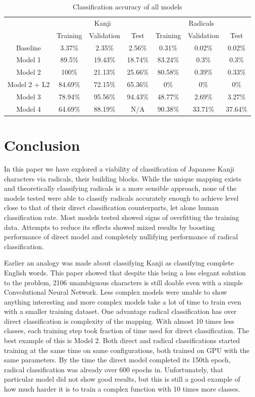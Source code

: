 \documentclass{article}
\begin{document}
\begin{CJK*}{UTF8}{min}
\begin{table}[h]
    \centering
    \begin{tabular}{|c|c|c|c|c|c|c|}
        \hline
         & \multicolumn{3}{c|}{Kanji} & \multicolumn{3}{c|}{Radicals}\\
        \cline{2-7}
         & Training & Validation & Test & Training & Validation & Test \\
        \hline
        Baseline & 3.37\% & 2.35\% & 2.56\% & 0.31\% & 0.02\% & 0.02\% \\
        Model 1 & 89.5\% & 19.43\% & 18.74\% & 83.24\% & 0.3\% & 0.3\% \\
        Model 2 & 100\% & 21.13\% & 25.66\% & 80.58\% & 0.39\% & 0.33\% \\
        Model 2 + L2 & 84.69\% & 72.15\% & 65.36\% & 0\% & 0\% & 0\% \\
        Model 3 & 78.94\% & 95.56\% & 94.43\% & 48.77\% & 2.69\% & 3.27\% \\
        Model 4 & 64.69\% & 88.19\% & N/A & 90.38\% & 33.71\% & 37.64\% \\
        \hline
    \end{tabular}
    \caption{Classification accuracy of all models}
    \label{tab:performance}
\end{table}

\section{Conclusion}
In this paper we have explored a viability of classification of Japanese Kanji characters via radicals, their building blocks. While the unique mapping exists and theoretically classifying radicals is a more sensible approach, none of the models tested were able to classify radicals accurately enough to achieve level close to that of their direct classification counterparts, let alone human classification rate. Most models tested showed signs of overfitting the training data. Attempts to reduce its effects showed mixed results by boosting performance of direct model and completely nullifying performance of radical classification.

Earlier an analogy was made about classifying Kanji as classifying complete English words. This paper showed that despite this being a less elegant solution to the problem, 2106 unambiguous characters is still doable even with a simple Convolutional Neural Network. Less complex models were unable to show anything interesting and more complex models take a lot of time to train even with a smaller training dataset. One advantage radical classification has over direct classification is complexity of the mapping. With almost 10 times less classes, each training step took fraction of time used for direct classification. The best example of this is Model 2. Both direct and radical classifications started training at the same time on same configurations, both trained on GPU with the same parameters. By the time the direct model completed its 150th epoch, radical classification was already over 600 epochs in. Unfortunately, that particular model did not show good results, but this is still a good example of how much harder it is to train a complex function with 10 times more classes.


\end{CJK*}
\end{document}
